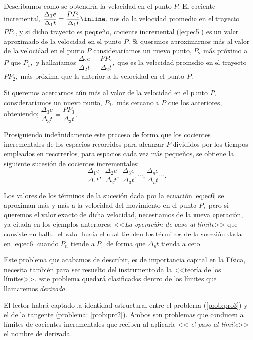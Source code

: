 \begin{solucion}
Describamos como se obtendría la velocidad en el punto $P$. El cociente
incremental, $\dfrac{\Delta_{1}e}{\Delta_{1}t}=\dfrac{PP_{1}}{\Delta_{1}t}\inline\text{\label{eq:ec5}}$\foreignlanguage{english}{,}
nos da la velocidad promedio en el trayecto $PP_{1}$, y si dicho
trayecto es pequeño, cociente incremental (\ref{eq:ec5}) es un valor
aproximado de la velocidad en el punto $P$. Si queremos aproximarnos
más al valor de la velocidad en el punto $P$ consideraríamos un nuevo
punto, $P_{2}$ más próximo a $P$ que $P_{1},$ y hallaríamos $\dfrac{\Delta_{2}e}{\Delta_{2}t}=\dfrac{PP_{2}}{\Delta_{2}t},$
que es la velocidad promedio en el trayecto $PP_{2},$ más próxima
que la anterior a la velocidad en el punto $P.$ 

Si queremos acercarnos aún más al valor de la velocidad en el punto
$P,$ consideraríamos un nuevo punto, $P_{3},$ más cercano a $P$
que los anteriores, obteniendo; $\dfrac{\Delta_{3}e}{\Delta_{3}t}=\dfrac{PP_{3}}{\Delta_{3}t}.$

Prosiguiendo indefinidamente este proceso de forma que los cocientes
incrementales de los espacios recorridos para alcanzar $P$ divididos
por los tiempos empleados en recorrerlos, para espacios cada vez más
pequeños, se obtiene la siguiente sucesión de cocientes incrementales:
\begin{equation}
\dfrac{\Delta_{1}e}{\Delta_{1}t},\;\dfrac{\Delta_{2}e}{\Delta_{2}t},\;\dfrac{\Delta_{3}e}{\Delta_{3}t},\cdots,\dfrac{\Delta_{n}e}{\Delta_{n}t}\cdots.\label{eq:ec6}
\end{equation}

Los valores de los términos de la sucesión dada por la ecuación \eqref{eq:ec6}
se aproximan más y más a la velocidad del movimiento en el punto $P,$
pero si queremos el valor exacto de dicha velocidad, necesitamos de
la nueva operación, ya citada en los ejemplos anteriores: <<\textsl{La
operación de paso al límite}>> que consiste en hallar el valor hacia
el cual tienden los términos de la sucesión dada en \eqref{eq:ec6}
cuando $P_{n}$ tiende a $P,$ de forma que $\Delta_{n}t$ tienda
a cero.

\end{solucion}

Este problema que acabamos de describir, es de importancia capital
en la Física, necesita también para ser resuelto del instrumento da
la <<teoría de los límites>>. este problema quedará clasificados
dentro de los límites que llamaremos \textsl{derivada}.

El lector habrá captado la identidad estructural entre el problema
(\ref{prob:pro3}) y el de la tangente (problema: \ref{prob:pro2}).
Ambos son problemas que conducen a límites de cocientes incrementales
que reciben al aplicarle << \textsl{el paso al límite}>> el nombre
de derivada. 

